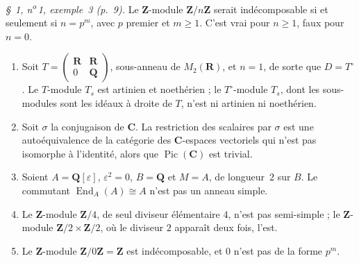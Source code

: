 \emph{§~1, n\textsuperscript{o}\,1, exemple~3 (p.~9).} Le $\mathbf Z$-module $\mathbf Z/n\mathbf Z$ serait indécomposable si et seulement si $n = p^m$, avec $p$ premier et $m \geq 1$. C'est vrai pour $n \geq 1$, faux pour $n = 0$.

\begin{encadre}
\begin{contrexemple}
\begin{enumerate}
\item[a)] Soit $T = \left(\begin{smallmatrix} \mathbf R & \mathbf R \\ 0 & \mathbf Q \end{smallmatrix}\right)$, sous-anneau de $M_2(\mathbf R)$, et $n = 1$, de sorte que $D = T^{\circ}$. Le $T$-module $T_s$ est artinien et noethérien ; le $T^{\circ}$-module $T_s$, dont les sous-modules sont les idéaux à droite de $T$, n'est ni artinien ni noethérien.
\item[b)] Soit $\sigma$ la conjugaison de $\mathbf C$. La restriction des scalaires par $\sigma$ est une autoéquivalence de la catégorie des $\mathbf C$-espaces vectoriels qui n'est pas isomorphe à l'identité, alors que $\operatorname{Pic}(\mathbf C)$ est trivial.
\item[c)] Soient $A = \mathbf Q[\varepsilon]$, $\varepsilon^2 = 0$, $B = \mathbf Q$ et $M = A$, de longueur~$2$ sur $B$. Le commutant $\operatorname{End}_A(A) \cong A$ n'est pas un anneau simple.
\item[d)] Le $\mathbf Z$-module $\mathbf Z/4$, de seul diviseur élémentaire $4$, n'est pas semi-simple ; le $\mathbf Z$-module $\mathbf Z/2 \times \mathbf Z/2$, où le diviseur $2$ apparaît deux fois, l'est.
\item[e)] Le $\mathbf Z$-module $\mathbf Z/0\mathbf Z = \mathbf Z$ est indécomposable, et $0$ n'est pas de la forme $p^m$.
\end{enumerate}
\end{contrexemple}
\end{encadre}

